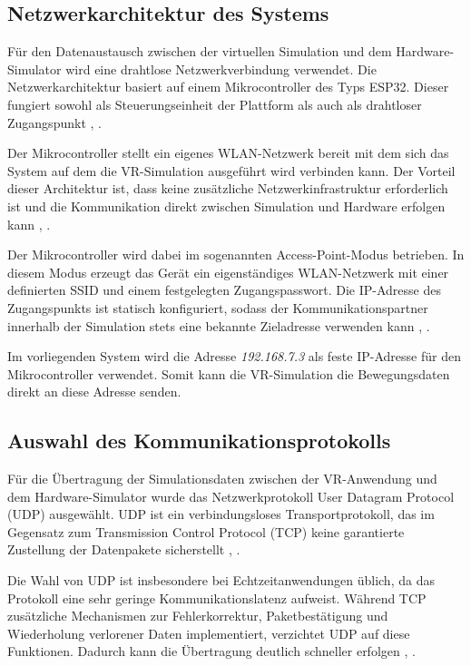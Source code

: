 \subsection{Netzwerkarchitektur des Systems}
Für den Datenaustausch zwischen der virtuellen Simulation und dem Hardware-Simulator wird eine drahtlose Netzwerkverbindung verwendet. Die Netzwerkarchitektur basiert auf einem Mikrocontroller des Typs ESP32. Dieser fungiert sowohl als Steuerungseinheit der Plattform als auch als drahtloser Zugangspunkt \cite{EspressifArduino}, \cite{Wikipedia}.

Der Mikrocontroller stellt ein eigenes WLAN-Netzwerk bereit mit dem sich das System auf dem die VR-Simulation ausgeführt wird verbinden kann. Der Vorteil dieser Architektur ist, dass keine zusätzliche Netzwerkinfrastruktur erforderlich ist und die Kommunikation direkt zwischen Simulation und Hardware erfolgen kann \cite{EspressifArduino}, \cite{ESP32WifiAccessPoint}.

Der Mikrocontroller wird dabei im sogenannten Access-Point-Modus betrieben. In diesem Modus erzeugt das Gerät ein eigenständiges WLAN-Netzwerk mit einer definierten SSID und einem festgelegten Zugangspasswort. Die IP-Adresse des Zugangspunkts ist statisch konfiguriert, sodass der Kommunikationspartner innerhalb der Simulation stets eine bekannte Zieladresse verwenden kann \cite{EspressifArduino}, \cite{ESP32WifiAccessPoint}.

Im vorliegenden System wird die Adresse \emph{192.168.7.3} als feste IP-Adresse für den Mikrocontroller verwendet. Somit kann die VR-Simulation die Bewegungsdaten direkt an diese Adresse senden.

\subsection{Auswahl des Kommunikationsprotokolls} \label{sec:communication-protocol}
Für die Übertragung der Simulationsdaten zwischen der VR-Anwendung und dem Hardware-Simulator wurde das Netzwerkprotokoll User Datagram Protocol (UDP) ausgewählt. UDP ist ein verbindungsloses Transportprotokoll, das im Gegensatz zum Transmission Control Protocol (TCP) keine garantierte Zustellung der Datenpakete sicherstellt \cite{Postel1980}, \cite{Peterson2007}.

Die Wahl von UDP ist insbesondere bei Echtzeitanwendungen üblich, da das Protokoll eine sehr geringe Kommunikationslatenz aufweist. Während TCP zusätzliche Mechanismen zur Fehlerkorrektur, Paketbestätigung und Wiederholung verlorener Daten implementiert, verzichtet UDP auf diese Funktionen. Dadurch kann die Übertragung deutlich schneller erfolgen \cite{Postel1980}, \cite{Peterson2007}.


